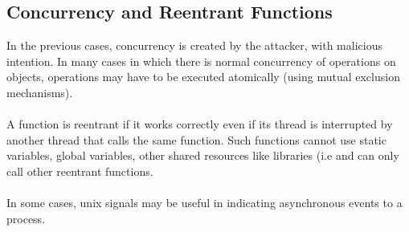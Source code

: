 \documentclass[10pt,a4paper]{report}
\begin{document}
\subsection{Concurrency and Reentrant Functions}
In the previous cases, concurrency is created by the attacker, with malicious intention. In many cases in which there is normal concurrency of operations on objects, operations may have to be executed atomically (using mutual exclusion mechanisms).\\
\\
A function is reentrant if it works correctly even if its thread is interrupted by another thread that calls the same function. Such functions cannot use static variables, global variables, other shared resources like libraries (i.e and can only call other reentrant functions.\\
\\
In some cases, unix signals may be useful in indicating asynchronous events to a process.
\end{document}
